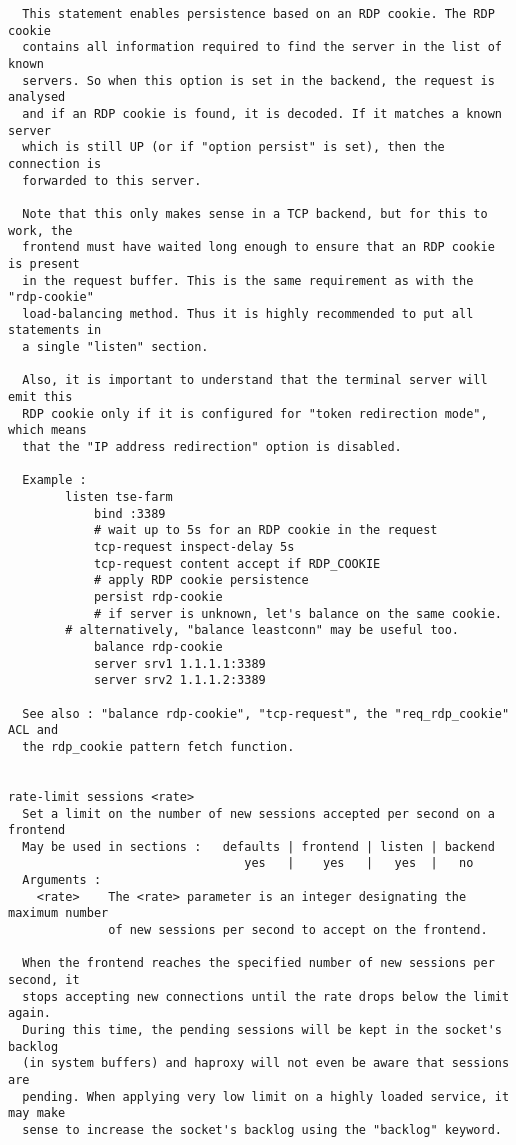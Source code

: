 \begin{verbatim}
  This statement enables persistence based on an RDP cookie. The RDP cookie
  contains all information required to find the server in the list of known
  servers. So when this option is set in the backend, the request is analysed
  and if an RDP cookie is found, it is decoded. If it matches a known server
  which is still UP (or if "option persist" is set), then the connection is
  forwarded to this server.

  Note that this only makes sense in a TCP backend, but for this to work, the
  frontend must have waited long enough to ensure that an RDP cookie is present
  in the request buffer. This is the same requirement as with the "rdp-cookie"
  load-balancing method. Thus it is highly recommended to put all statements in
  a single "listen" section.

  Also, it is important to understand that the terminal server will emit this
  RDP cookie only if it is configured for "token redirection mode", which means
  that the "IP address redirection" option is disabled.

  Example :
        listen tse-farm
            bind :3389
            # wait up to 5s for an RDP cookie in the request
            tcp-request inspect-delay 5s
            tcp-request content accept if RDP_COOKIE
            # apply RDP cookie persistence
            persist rdp-cookie
            # if server is unknown, let's balance on the same cookie.
	    # alternatively, "balance leastconn" may be useful too.
            balance rdp-cookie
            server srv1 1.1.1.1:3389
            server srv2 1.1.1.2:3389

  See also : "balance rdp-cookie", "tcp-request", the "req_rdp_cookie" ACL and
  the rdp_cookie pattern fetch function.


rate-limit sessions <rate>
  Set a limit on the number of new sessions accepted per second on a frontend
  May be used in sections :   defaults | frontend | listen | backend
                                 yes   |    yes   |   yes  |   no
  Arguments :
    <rate>    The <rate> parameter is an integer designating the maximum number
              of new sessions per second to accept on the frontend.

  When the frontend reaches the specified number of new sessions per second, it
  stops accepting new connections until the rate drops below the limit again.
  During this time, the pending sessions will be kept in the socket's backlog
  (in system buffers) and haproxy will not even be aware that sessions are
  pending. When applying very low limit on a highly loaded service, it may make
  sense to increase the socket's backlog using the "backlog" keyword.


\end{verbatim}
